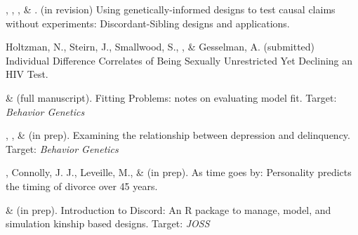 



\item \meb, \jt, \yrh, \& \joe. (in revision) Using genetically-informed designs to test causal claims without experiments: Discordant-Sibling designs and applications. \href{https://osf.io/zpdwt/}{\small\color{blue}{osf.io/zpdwt/}}%

\item Holtzman, N., Steirn, J., Smallwood, S., \meb, \& Gesselman, A. (submitted) Individual Difference Correlates of Being Sexually Unrestricted Yet Declining an HIV Test. %

\item \meb \& \joe (full  manuscript). Fitting Problems: notes on evaluating model fit. Target: \textit{Behavior Genetics}

\item \emsims, \jt, \& \meb (in prep). Examining the relationship between depression and delinquency. Target: \textit{Behavior Genetics}

\item \meb, Connolly, J. J., Leveille, M., \& \jjj (in prep). As time goes by: Personality predicts the timing of divorce over 45 years.%
%


\item \jt \& \meb (in prep). Introduction to Discord: An R package to manage, model, and simulation kinship based designs. Target: \textit{JOSS}







